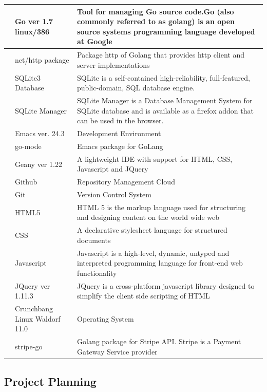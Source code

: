 \documentclass[hidelinks,a4paper,12pt]{article}
\begin{document}
\begin{center}
{\begin{tabularx}{\textwidth}{ | >{\ttfamily\raggedright\arraybackslash} s 
	| >{\ttfamily\raggedright\arraybackslash} t 
	| >{\ttfamily\raggedright\arraybackslash} t | }
	 & Go ver 1.7 linux/386 & Tool for managing Go source code.Go (also commonly referred to as golang) is an open source systems programming language developed at Google  \\
	 & net/http package & Package http of Golang that provides http client and server implementations  \\
	 & SQLite3 Database & SQLite is a self-contained high-reliability, full-featured, public-domain, SQL database engine.  \\ [1em]
	 & SQLite Manager & SQLite Manager is a Database Management System for SQLite database and is available as a firefox addon that can be used in the browser.  \\  [1em]
	 & Emacs ver. 24.3 & Development Environment  \\ 
	 & go-mode & Emacs package for GoLang \\ [1em]
	 & Geany ver 1.22 & A lightweight IDE with support for HTML, CSS, Javascript and JQuery \\ [1em]
	 & Github & Repository Management Cloud  \\ [1em]
	 & Git & Version Control System  \\ [1em]
	 & HTML5 & HTML 5 is the markup language used for structuring and designing content on the world wide web  \\ [1em]
	 & CSS & A declarative stylesheet language for structured documents  \\ [1em]
	 & Javascript & Javascript is a high-level, dynamic, untyped and interpreted programming language for front-end web functionality  \\ [1em]
	 & JQuery ver 1.11.3 & JQuery is a cross-platform javascript library designed to simplify the client side scripting of HTML  \\ [1em]
	 & Crunchbang Linux Waldorf 11.0 & \Gls{Operating System}   \\ 
	 & stripe-go & Golang package for Stripe \gls{API}. Stripe is a \Gls{Payment Gateway} Service provider   \\ 
	\hline	   	    		       	           								
	\end{tabularx}
	}
\end{center}
						
\bigskip
\noindent


\subsection{Project Planning}
\end{document}

